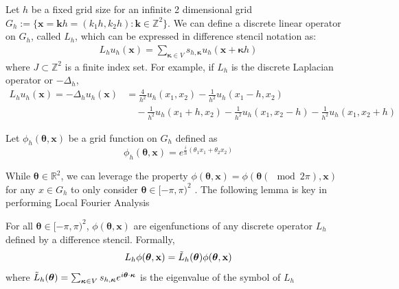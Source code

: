 \documentclass[12pt]{article}
\begin{document}
Let $h$ be a fixed grid size for an infinite 2 dimensional grid $G_h := \{\mathbf{x} = \mathbf{k}h = (k_1h, k_2h): \mathbf{k} \in \mathbb{Z}^2\}$. We can define a discrete linear operator on $G_h$, called $L_h$, which can be expressed in difference stencil notation as:
\begin{align*}
    L_h u_h(\mathbf{x}) = \sum_{\boldsymbol{\kappa} \in V} s_{h, \boldsymbol{\kappa}} u_h(\mathbf{x} + \boldsymbol{\kappa} h)
\end{align*}
where $J \subset \mathbb{Z}^2$ is a finite index set. For example, if $L_h$ is the discrete Laplacian operator or $-\Delta_h$, 
\begin{align*}
    L_h u_h(\mathbf{x}) = -\Delta_h u_h(\mathbf{x}) &= \frac{4}{h^2}u_h(x_1, x_2) - \frac{1}{h^2}u_h(x_1 - h, x_2) \\
    &\quad - \frac{1}{h^2}u_h(x_1 + h, x_2) - \frac{1}{h^2}u_h(x_1, x_2 - h) - \frac{1}{h^2}u_h(x_1, x_2 + h)
\end{align*}

Let $\phi_h(\boldsymbol{\theta}, \mathbf{x})$ be a grid function on $G_h$ defined as
\begin{equation}
    \phi_h(\boldsymbol{\theta}, \mathbf{x}) = e^{\frac{i}{h}\left(\theta_1x_1 + \theta_2x_2\right)} \label{eq:discretefourierbasis}
\end{equation}

While $\boldsymbol{\theta} \in \mathbb{R}^2$, we can leverage the property $\phi(\boldsymbol{\theta}, \mathbf{x}) = \phi(\boldsymbol{\theta} (\mod 2\pi), \mathbf{x})$  for any $x \in G_h$ to only consider $\boldsymbol{\theta} \in [-\pi, \pi)^2$ . The following lemma is key in performing Local Fourier Analysis
\begin{lemma} \label{th:eigendecomposition}
    For all $\boldsymbol{\theta} \in [-\pi, \pi)^2$, $\phi(\boldsymbol{\theta}, \mathbf{x})$ are eigenfunctions of any discrete operator $L_h$ defined by a difference stencil.
    Formally,
    \begin{align*}
        L_h \phi(\boldsymbol{\theta}, \mathbf{x}) = \Tilde{L}_h(\boldsymbol{\theta}) \phi(\boldsymbol{\theta}, \mathbf{x})
    \end{align*}
    where $\Tilde{L}_h(\boldsymbol{\theta}) = \sum_{\boldsymbol{\kappa} \in V} s_{h, \boldsymbol{\kappa}} e^{i\boldsymbol{\theta}\cdot \boldsymbol{\kappa}}$ is the eigenvalue of the symbol of $L_h$
\end{lemma}
\end{document}
